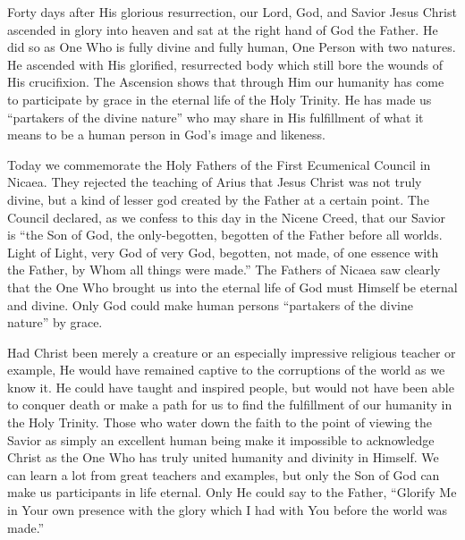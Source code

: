 \documentclass[twoside, letterpaper, 12pt]{report}
\begin{document}
\peopleline{\gne}


\begin{maybetwocolumns}

Forty days after His glorious resurrection, our Lord, God, and Savior Jesus Christ ascended
in glory into heaven and sat at the right hand of God the Father. He did so as One Who is fully
divine and fully human, One Person with two natures. He ascended with His glorified, resurrected
body which still bore the wounds of His crucifixion. The Ascension shows that through Him our
humanity has come to participate by grace in the eternal life of the Holy Trinity. He has made us
“partakers of the divine nature” who may share in His fulfillment of what it means to be a human
person in God’s image and likeness.

Today we commemorate the Holy Fathers of the First Ecumenical Council in Nicaea. They
rejected the teaching of Arius that Jesus Christ was not truly divine, but a kind of lesser god created
by the Father at a certain point. The Council declared, as we confess to this day in the Nicene
Creed, that our Savior is “the Son of God, the only-begotten, begotten of the Father before all
worlds. Light of Light, very God of very God, begotten, not made, of one essence with the Father,
by Whom all things were made.” The Fathers of Nicaea saw clearly that the One Who brought us
into the eternal life of God must Himself be eternal and divine. Only God could make human
persons “partakers of the divine nature” by grace.

Had Christ been merely a creature or an especially impressive religious teacher or example, He
would have remained captive to the corruptions of the world as we know it. He could have taught
and inspired people, but would not have been able to conquer death or make a path for us to find
the fulfillment of our humanity in the Holy Trinity. Those who water down the faith to the point
of viewing the Savior as simply an excellent human being make it impossible to acknowledge
Christ as the One Who has truly united humanity and divinity in Himself. We can learn a lot from
great teachers and examples, but only the Son of God can make us participants in life eternal. Only
He could say to the Father, “Glorify Me in Your own presence with the glory which I had with
You before the world was made.”


\end{maybetwocolumns}
\end{document}

